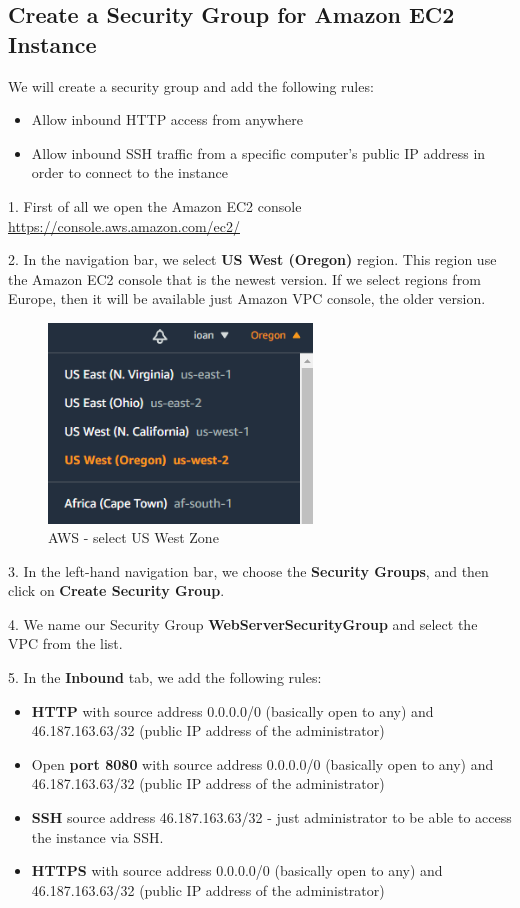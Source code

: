 \documentclass[12pt,a4paper,twoside]{article}
\begin{document}
\subsection{Create a Security Group for Amazon EC2 Instance}


We will create a security group and add the following rules:
\begin{itemize}
	\item Allow inbound HTTP access from anywhere
	\item Allow inbound SSH traffic from a specific computer's public IP address in order to connect to the instance
\end{itemize}


1. First of all we open the Amazon EC2 console \url{ https://console.aws.amazon.com/ec2/} 


2. In the navigation bar, we select \textbf{US West (Oregon)} region. This region use the Amazon EC2 console that is the newest version. If we select regions from Europe, then it will be available just Amazon VPC console, the older version.


\begin{figure}[H]
    \centering
        \includegraphics[width=7cm]{images-aws/1-aws-zone.png}
        \caption{AWS - select US West Zone}
\end{figure}


3. In the left-hand navigation bar, we choose the \textbf{Security Groups}, and then click on \textbf{Create Security Group}.


4. We name our Security Group \textbf{WebServerSecurityGroup} and select the VPC from the list.


5. In the \textbf{Inbound} tab, we add the following rules:
\begin{itemize}
	\item \textbf{HTTP} with source address 0.0.0.0/0 (basically open to any) and 46.187.163.63/32 (public IP address of the administrator)
	\item Open \textbf{port 8080} with source address 0.0.0.0/0 (basically open to any) and 46.187.163.63/32 (public IP address of the administrator)
	\item \textbf{SSH}   source address 46.187.163.63/32 - just administrator to be able to access the instance via SSH.
	\item \textbf{HTTPS} with source address 0.0.0.0/0 (basically open to any) and 46.187.163.63/32 (public IP address of the administrator)
\end{itemize}
\end{document}
